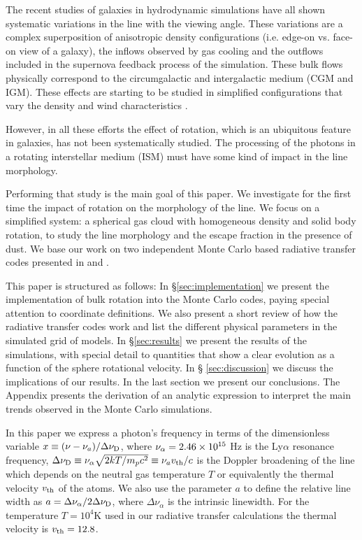 \documentclass{emulateapj}
\newcommand{\ly}{{\ifmmode{{\rm Ly}\alpha~}\else{Ly$\alpha$~}\fi}}
\newcommand{\kms}{{\ifmmode{{\mathrm{\,km\ s}^{-1}}}\else{\,km~s$^{-1}$}\fi}}
\begin{document}
The recent studies of galaxies in hydrodynamic simulations
\citep{Laursen09,Barnes11,Verhamme12,Yajima12} have all shown
systematic variations in the \ly line with the viewing angle. These
variations are a complex superposition of anisotropic density
configurations (i.e. edge-on vs. face-on view of a galaxy), the
inflows observed by gas cooling and the outflows included in the
supernova feedback process of the simulation. These bulk flows
physically correspond to the circumgalactic and intergalactic medium
(CGM and IGM). These effects are starting to be studied
 in simplified configurations that vary the density and wind
 characteristics \citep{Zheng2013,Behrens2014}. 

However, in all these efforts the effect of rotation,
which is an ubiquitous feature in galaxies, has not been
systematically studied. The processing of the \ly photons in a
rotating interstellar medium (ISM) must have some kind of impact in
the \ly line morphology. 

Performing that study is the main goal of this paper. We investigate for the
first time the impact of rotation on the morphology of the \ly
line. We focus on a simplified system: a spherical gas cloud with
homogeneous density and solid body rotation, to study the line
morphology and the escape fraction in the presence of dust. We base
our work on two independent Monte Carlo based radiative transfer codes
presented in \cite{CLARA} and \cite{DijkstraKramer}.   
  
This paper is structured as follows: In \S \ref{sec:implementation} we
present the implementation of bulk rotation into the Monte Carlo
codes, paying special attention to coordinate definitions. We also
present a short review of how the \ly radiative transfer codes work
and list the different physical parameters in the simulated grid of
models. In \S \ref{sec:results} we present the results of the
simulations, with special detail to quantities that show a
clear evolution as a function of the sphere rotational velocity. In \S
\ref{sec:discussion} we discuss the implications of our results. In
the last section we present our conclusions. The Appendix presents the
derivation of an analytic expression to interpret
the main trends observed in the Monte Carlo simulations.


In this paper we express a photon's frequency in terms of the
dimensionless variable $x\equiv (\nu -\nu_a)/\Delta\nu_{\rm D}$, where
$\nu_{\rm \alpha}=2.46\times 10^{15}$ Hz is the Ly$\alpha$ resonance
frequency,  $\Delta\nu_{\rm D} \equiv
\nu_{\alpha}\sqrt{2kT/m_pc^2}\equiv \nu_av_{\rm th}/c $ is the Doppler
broadening of the line which depends on the neutral gas temperature
$T$ or equivalently the thermal velocity
$v_{\rm th}$ of the atoms. We also use the parameter $a$ to define the
relative line width as $a=\Delta\nu_{\alpha}/2\Delta\nu_{\rm D}$,
where $\Delta\nu_{\alpha}$ is the intrinsic linewidth. For the
temperature $T=10^4$K used in our radiative transfer calculations the
thermal velocity is $v_{\rm th}=12.8$\kms.   
\end{document}

